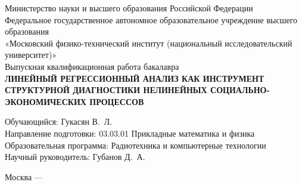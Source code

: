 \begin{titlepage}
\thispagestyle{empty}
\begin{center}
{\small Министерство науки и высшего образования Российской Федерации}\\[0.5cm]
{\small Федеральное государственное автономное образовательное учреждение высшего образования}\\[0.2cm]
{\small «Московский физико-технический институт (национальный исследовательский университет)»}\\[2.0cm]

{\small Выпускная квалификационная работа бакалавра}\\[3.0cm]

{\bfseries\large ЛИНЕЙНЫЙ РЕГРЕССИОННЫЙ АНАЛИЗ КАК ИНСТРУМЕНТ СТРУКТУРНОЙ ДИАГНОСТИКИ НЕЛИНЕЙНЫХ СОЦИАЛЬНО-ЭКОНОМИЧЕСКИХ ПРОЦЕССОВ}\\[2.5cm]
\end{center}

\begin{flushright}
\begin{minipage}{0.45\textwidth}
\small
Обучающийся: Гукасян В.~Л.\\[0.5cm]
Направление подготовки: 03.03.01 Прикладные математика и физика\\[0.5cm]
Образовательная программа: Радиотехника и компьютерные технологии\\[0.5cm]
Научный руководитель: Губанов Д.~А.
\end{minipage}
\end{flushright}

\vfill
\begin{center}
Москва --- \the\year{}
\end{center}
\end{titlepage}
